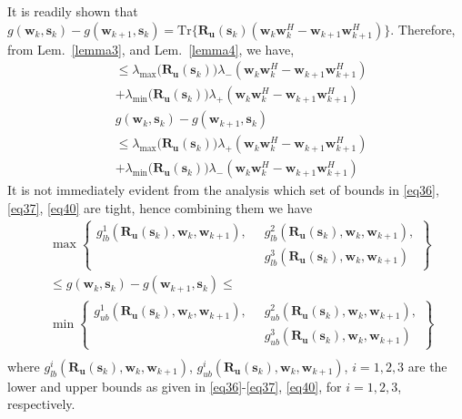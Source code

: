 \documentclass[11pt,draftclsnofoot,onecolumn]{IEEEtran}
\theoremstyle{definition}
\theoremstyle{remark}
\begin{document}
It is readily shown that $g(\mathbf{w}_k,\mathbf{s}_k)-g(\mathbf{w}_{k+1},\mathbf{s}_k)=\mathrm{Tr}\{\mathbf{R_u}(\mathbf{s}_k)  ( \mathbf{w}_k\mathbf{w}_k^H-\mathbf{w}_{k+1} \mathbf{w}_{k+1}^H) \}$. Therefore, from Lem.~\ref{lemma3}, and Lem.~\ref{lemma4}, we have,
\begin{align} \label{eq40}
&\leq \lambda_{\max}\big( \mathbf{R_u}( \mathbf{s}_k) \big)\lambda_{-}(\mathbf{w}_k\mathbf{w}_k^H-\mathbf{w}_{k+1} \mathbf{w}_{k+1}^H) \nonumber\\
&+\lambda_{\min}\big( \mathbf{R_u}( \mathbf{s}_k) \big)\lambda_{+}(\mathbf{w}_k\mathbf{w}_k^H-\mathbf{w}_{k+1} \mathbf{w}_{k+1}^H) \nonumber \nonumber \\
&g(\mathbf{w}_k,\mathbf{s}_k)-g(\mathbf{w}_{k+1},\mathbf{s}_k) \\
 &\leq \lambda_{\max}\big( \mathbf{R_u}( \mathbf{s}_k) \big)\lambda_{+}(\mathbf{w}_k\mathbf{w}_k^H-\mathbf{w}_{k+1} \mathbf{w}_{k+1}^H) \nonumber\\
&+\lambda_{\min}\big( \mathbf{R_u}( \mathbf{s}_k) \big)\lambda_{-}(\mathbf{w}_k\mathbf{w}_k^H-\mathbf{w}_{k+1} \mathbf{w}_{k+1}^H) \nonumber
\end{align}
It is not  immediately evident from the analysis which set of bounds in \eqref{eq36}, \eqref{eq37}, \eqref{eq40} are tight, hence combining them we have
\begin{align*}
&\max\left\{ \begin{aligned} g_{lb}^1( \mathbf{R_u}( \mathbf{s}_k), \mathbf{w}_k, \mathbf{w}_{k+1}), \;\; &g_{lb}^2( \mathbf{R_u}( \mathbf{s}_k), \mathbf{w}_k, \mathbf{w}_{k+1}), \\
&g_{lb}^3( \mathbf{R_u}( \mathbf{s}_k), \mathbf{w}_k, \mathbf{w}_{k+1}) \end{aligned}\right\} \\
&\leq g(\mathbf{w}_k,\mathbf{s}_k)-g(\mathbf{w}_{k+1},\mathbf{s}_k)  \leq \\
&\min\left\{ \begin{aligned} g_{ub}^1( \mathbf{R_u}( \mathbf{s}_k), \mathbf{w}_k, \mathbf{w}_{k+1}), \;\; &g_{ub}^2( \mathbf{R_u}( \mathbf{s}_k), \mathbf{w}_k, \mathbf{w}_{k+1}), \\
&g_{ub}^3( \mathbf{R_u}( \mathbf{s}_k), \mathbf{w}_k, \mathbf{w}_{k+1}) \end{aligned}\right\} \\
\end{align*}
 where $g_{lb}^i (\mathbf{R_u}( \mathbf{s}_k), \mathbf{w}_k, \mathbf{w}_{k+1})$, $g_{ub}^i (\mathbf{R_u}( \mathbf{s}_k), \mathbf{w}_k, \mathbf{w}_{k+1})$, $i=1,2,3$ are the lower and upper bounds as given in \eqref{eq36}-\eqref{eq37}, \eqref{eq40}, for $i=1,2,3$, respectively.
 
\end{document}
